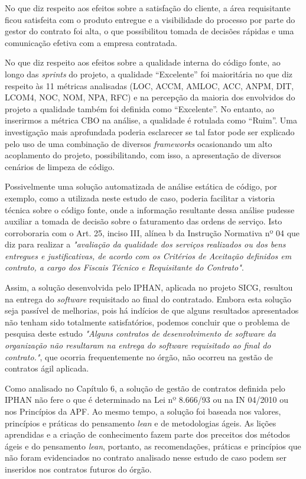 No que diz respeito aos efeitos sobre a satisfação do cliente, a área requisitante ficou satisfeita com o produto entregue e a visibilidade do processo por parte do gestor do contrato foi alta, o que possibilitou tomada de decisões rápidas e uma comunicação efetiva com a empresa contratada.
 
No que diz respeito aos efeitos sobre a qualidade interna do código fonte, ao longo das \textit{sprints} do projeto, a qualidade “Excelente” foi maioritária no que diz respeito às 11 métricas analisadas (LOC, ACCM, AMLOC, ACC, ANPM, DIT, LCOM4, NOC, NOM, NPA, RFC) e na percepção da maioria dos envolvidos do projeto a qualidade também foi definida como “Excelente”. No entanto, ao inserirmos a métrica CBO na análise, a qualidade é rotulada como “Ruim”. Uma investigação mais aprofundada poderia esclarecer se tal fator pode ser explicado pelo uso de uma combinação de diversos \textit{frameworks} ocasionando um alto acoplamento do projeto, possibilitando, com isso, a apresentação de diversos cenários de limpeza de código. 

Possivelmente uma solução automatizada de análise estática de código, por exemplo, como a utilizada neste estudo de caso, poderia facilitar a vistoria técnica sobre o código fonte, onde a informação resultante dessa análise pudesse auxiliar a tomada de decisão sobre o faturamento das ordens de serviço. Isto corroboraria com o Art. 25, inciso III, alínea b da Instrução Normativa nº 04 \cite{IN04:2010} que diz para realizar a \textit{"avaliação da qualidade dos serviços realizados ou dos bens entregues e justificativas, de acordo com os Critérios de Aceitação definidos em contrato, a cargo dos Fiscais Técnico e Requisitante do Contrato"}.

Assim, a solução desenvolvida pelo IPHAN, aplicada no projeto SICG, resultou na entrega do \textit{software} requisitado ao final do contratado.  Embora esta solução seja passível de melhorias, pois há indícios de que alguns resultados apresentados não tenham sido totalmente satisfatórios, podemos concluir que o problema de pesquisa deste estudo \textit{"Alguns contratos de desenvolvimento de \textit{software} da organização não resultaram na entrega do \textit{software} requisitado ao final do contrato."}, que ocorria frequentemente no órgão, não ocorreu na gestão de contratos ágil aplicada.

Como analisado no Capítulo 6, a solução de gestão de contratos definida pelo IPHAN não fere o que é determinado na Lei nº 8.666/93 ou na IN 04/2010  ou nos Princípios da APF. Ao mesmo tempo, a solução foi baseada nos valores, princípios e práticas do pensamento \textit{lean} e de metodologias ágeis. As lições aprendidas e a criação de conhecimento fazem parte dos preceitos dos métodos ágeis e do pensamento \textit{lean}, portanto, as recomendações, práticas e princípios que não foram evidenciados no contrato analisado nesse estudo de caso podem ser inseridos nos contratos futuros do órgão.

